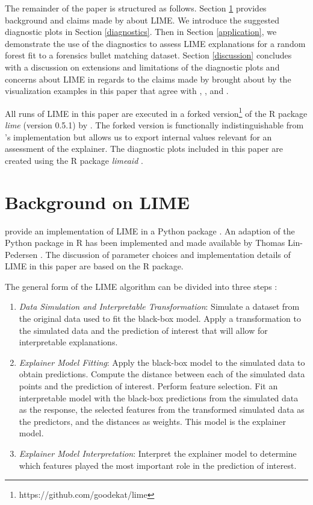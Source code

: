 \documentclass[AMS,STIX2COL]{WileyNJD-v2}\usepackage[]{graphicx}\usepackage[]{color}
\begin{document}
The remainder of the paper is structured as follows. Section \ref{background} provides background and claims made by \citet{ribeiro:2016} about LIME. We introduce the suggested diagnostic plots in Section \ref{diagnostics}. Then in Section \ref{application}, we demonstrate the use of the diagnostics to assess LIME explanations for a random forest  fit to a forensics bullet matching dataset. Section \ref{discussion} concludes with a discussion on extensions and limitations of the diagnostic plots and concerns about LIME in regards to the claims made by \citet{ribeiro:2016} brought about by the visualization examples in this paper that agree with \citet{alvarezmelis:2018}, \citet{laugel:2018}, and \citet{molnar:2019}.

All runs of LIME in this paper are executed in a forked version\footnote{https://github.com/goodekat/lime} of the R package \emph{lime} (version 0.5.1) by \citet{pedersen:2020}. The forked version is functionally indistinguishable from \citeauthor{pedersen:2020}'s implementation but allows us to export internal values relevant for an assessment of the explainer. The diagnostic plots included in this paper are created using the R package \emph{limeaid} \citep{goode:2020}.

\section{Background on LIME} \label{background}

\citet{ribeiro:2016} provide an implementation of LIME in a Python package \cite{ribeiro:2020}. An adaption of the Python package in R has been implemented and made available by Thomas Lin-Pedersen \citep{pedersen:2020}. The discussion of parameter choices and implementation details of LIME in this paper are based on the R package.

The general form of the LIME algorithm can be divided into three steps \citep[see also][]{laugel:2018}:

\begin{enumerate}

\item \emph{Data Simulation and Interpretable Transformation}: Simulate a dataset from the original data used to fit the black-box model. Apply a transformation to the simulated data and the prediction of interest that will allow for interpretable explanations.

\item \emph{Explainer Model Fitting}: Apply the black-box model to the simulated data to obtain predictions. Compute the distance between each of the simulated data points and the prediction of interest. Perform feature selection. Fit an interpretable model with the black-box predictions from the simulated data as the response, the selected features from the transformed simulated data as the predictors, and the distances as weights. This model is the explainer model.

\item \emph{Explainer Model Interpretation}: Interpret the explainer model to determine which features played the most important role in the prediction of interest.

\end{enumerate}
\end{document}

